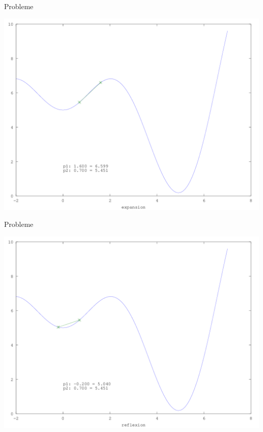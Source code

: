 \documentclass[\outputformat]{beamer}
\begin{document}
\begin{frame}{Probleme}
	\begin{center}
		\includegraphics[height=0.75\paperheight]{../bilder/LokMinima/sinx_x003.png}
	\end{center}
\end{frame}
\begin{frame}{Probleme}
	\begin{center}
		\includegraphics[height=0.75\paperheight]{../bilder/LokMinima/sinx_x004.png}
	\end{center}
\end{frame}
\end{document}
